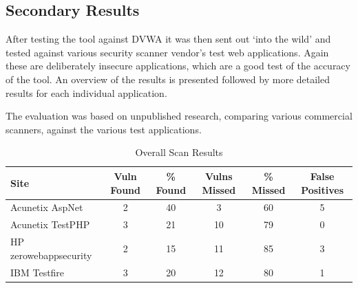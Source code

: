 \documentclass[12pt,a4paper]{article}
\begin{document}
\subsection{Secondary Results}
After testing the tool against DVWA it was then sent out `into the wild' and tested against various security scanner vendor's test web applications.  Again these are deliberately insecure applications, which are a good test of the accuracy of the tool.  An overview of the results is presented followed by more detailed results for each individual application.

The evaluation was based on unpublished research, comparing various commercial scanners, against the various test applications. %

\begin{center}
    \begin{table}
        \caption{Overall Scan Results}
        \begin{center}
            \begin{tabular}{ | l | c | c | c | c | c | }
                \hline
                Site & Vuln Found & \% Found & Vulns Missed & \% Missed & False Positives  \\ \hline
                Acunetix AspNet & 2 & 40 & 3 & 60 & 5 \\ \hline
                Acunetix TestPHP & 3 & 21 & 10 & 79 & 0 \\ \hline
                HP zerowebappsecurity & 2 & 15 & 11 & 85 & 3 \\ \hline
                IBM Testfire & 3 & 20 & 12 & 80 & 1 \\ 
                \hline
            \end{tabular}
        \end{center}
    \end{table}
\end{center}
\end{document}

